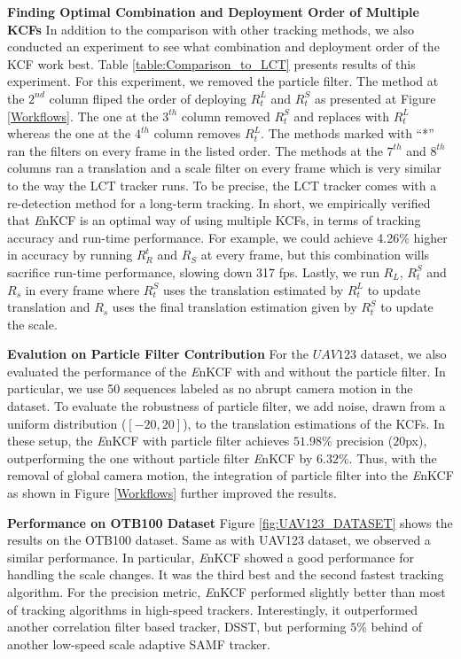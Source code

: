 \documentclass[10pt,twocolumn,letterpaper]{article}
\begin{document}
\textbf{Finding Optimal Combination and Deployment Order of Multiple
  KCFs} In addition to the comparison with other tracking methods, we
also conducted an experiment to see what combination and deployment
order of the KCF work best. Table \ref{table:Comparison_to_LCT}
presents results of this experiment. For this experiment, we removed
the particle filter. The method at the $2^{nd}$ column fliped the
order of deploying $R_{t}^{L}$ and $R_{t}^{S}$ as presented at Figure
\ref{Workflows}. The one at the $3^{th}$ column removed $R_{t}^{S}$
and replaces with $R_{t}^{L}$ whereas the one at the $4^{th}$ column
removes $R_{t}^{L}$. The methods marked with ``*'' ran the filters on
every frame in the listed order. The methods at the $7^{th}$ and
$8^{th}$ columns ran a translation and a scale filter on every frame
which is very similar to the way the LCT tracker \cite{ma2015long}
runs. To be precise, the LCT tracker comes with a re-detection method
for a long-term tracking. In short, we empirically verified that
\textit{E}nKCF is an optimal way of using multiple KCFs, in terms of
tracking accuracy and run-time performance. For example, we could
achieve 4.26\% higher in accuracy by running $R_{R}^{t}$ and $R_{S}$
at every frame, but this combination wills sacrifice run-time
performance, slowing down 317 fps. Lastly, we run $R_{L}$, $R_{t}^{S}$
and $R_{s}$ in every frame where $R_{t}^{S}$ uses the translation
estimated by $R_{t}^{L}$ to update translation and $R_{s}$ uses the
final translation estimation given by $R_{t}^{S}$ to update the scale.

\textbf{Evalution on Particle Filter Contribution} For the $UAV123$
dataset, we also evaluated the performance of the {\it E}nKCF with and
without the particle filter. In particular, we use 50 sequences
labeled as no abrupt camera motion in the dataset. To evaluate the
robustness of particle filter, we add noise, drawn from a uniform
distribution ($[-20,20]$), to the translation estimations of the
KCFs. In these setup, the {\it E}nKCF with particle filter achieves
$51.98\%$ precision ($20$px), outperforming the one without particle
filter {\it E}nKCF by $6.32\%$. Thus, with the removal of global
camera motion, the integration of particle filter into the {\it E}nKCF
as shown in Figure \ref{Workflows} further improved the results.

\textbf{Performance on OTB100 Dataset} Figure \ref{fig:UAV123_DATASET}
shows the results on the OTB100 dataset. Same as with UAV123 dataset,
we observed a similar performance. In particular, {\it E}nKCF showed a
good performance for handling the scale changes. It was the third best
and the second fastest tracking algorithm. For the precision metric,
{\it E}nKCF performed slightly better than most of tracking algorithms
in high-speed trackers. Interestingly, it outperformed another
correlation filter based tracker, DSST, but performing $5\%$ behind of
another low-speed scale adaptive SAMF tracker.
\end{document}
